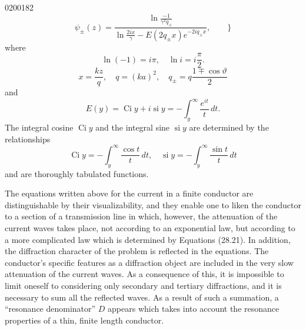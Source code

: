 \begin{scanpage}{0200}{182}
\[
\psi_\pm(z)=\frac{\displaystyle\ln\frac{-1}{\gamma^2q_\pm}}{\displaystyle\ln\frac{2ix}{\gamma}-E(2q_\pm x)e^{-2iq_\pm x}},\qquad\Biggr\}\tag{28.21}
\]
\noindent where
\[
\ln(-1)=i\pi,\quad\ln i=i\frac\pi2.\tag{28.22}
\]
\[
x=\frac{kz}{q},\quad q=(ka)^2,\quad q_\pm=q\frac{1\mp\cos\vartheta}{2}\tag{28.23}
\]
\noindent and
\[
E(y)=\operatorname{Ci}y+i\operatorname{si}y=-\int_y^\infty\frac{e^{it}}t\,dt.\tag{28.24}
\]
The integral cosine $\operatorname{Ci}y$ and the integral sine $\operatorname{si}y$ are determined by the relationships
\[
\operatorname{Ci}y=-\int_y^\infty\frac{\cos t}t\,dt,\quad
\operatorname{si}y=-\int_y^\infty\frac{\sin t}t\,dt\tag{28.25}
\]
and are thoroughly tabulated functions.

The equations written above for the current in a finite conductor are distinguishable by their visualizability, and they enable one to liken the conductor to a section of a transmission line in which, however, the attenuation of the current waves takes place, not according to an exponential law, but according to a more complicated law which is determined by Equations (28.21). In addition, the diffraction character of the problem is reflected in the equations. The conductor's specific features as a diffraction object are included in the very slow attenuation of the current waves. As a consequence of this, it is impossible to limit oneself to considering only secondary and tertiary diffractions, and it is necessary to sum all the reflected waves. As a result of such a summation, a ``resonance denominator'' $D$ appears which takes into account the resonance properties of a thin, finite length conductor.
\end{scanpage}

